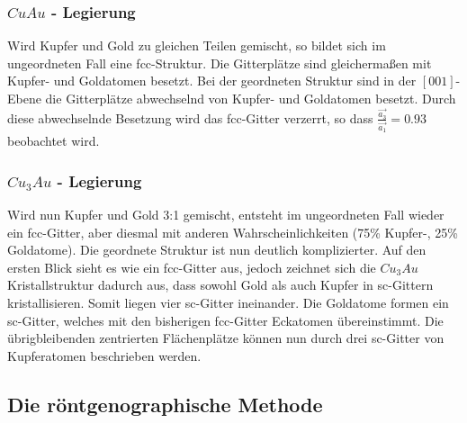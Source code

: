         \subsubsection{$CuAu$ - Legierung}
            Wird Kupfer und Gold zu gleichen Teilen gemischt, so bildet sich im ungeordneten Fall eine fcc-Struktur. Die Gitterplätze sind gleichermaßen
            mit Kupfer- und Goldatomen besetzt. Bei der geordneten Struktur sind in der $[001]$-Ebene die Gitterplätze abwechselnd von Kupfer- und Goldatomen besetzt.
            Durch diese abwechselnde Besetzung wird das fcc-Gitter verzerrt, so dass $\frac{\vec{a_3}}{\vec{a_1}} = 0.93$ beobachtet wird.

        \subsubsection{$Cu_3Au$ - Legierung}
            Wird nun Kupfer und Gold 3:1 gemischt, entsteht im ungeordneten Fall wieder ein fcc-Gitter, aber diesmal mit anderen Wahrscheinlichkeiten
            (75\% Kupfer-, 25\% Goldatome). Die geordnete Struktur ist nun deutlich komplizierter. Auf den ersten Blick sieht es wie ein fcc-Gitter aus, 
            jedoch zeichnet sich die $Cu_3Au$ Kristallstruktur dadurch aus, dass sowohl Gold als auch Kupfer in sc-Gittern kristallisieren. Somit liegen 
            vier sc-Gitter ineinander. Die Goldatome formen ein sc-Gitter, welches mit den bisherigen fcc-Gitter Eckatomen übereinstimmt.
            Die übrigbleibenden zentrierten Flächenplätze können nun durch  drei sc-Gitter von Kupferatomen beschrieben werden.
    \subsection{Die röntgenographische Methode}


